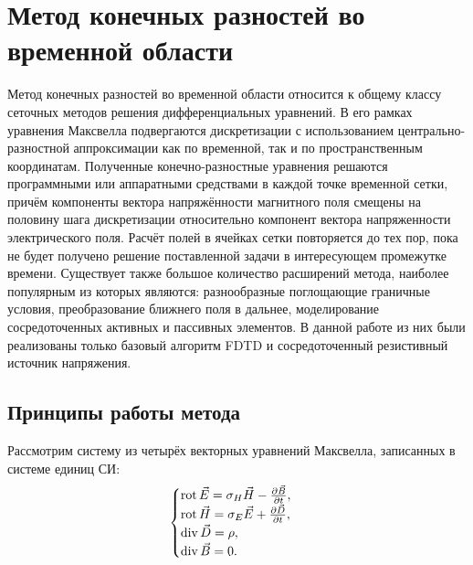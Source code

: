 \section{Метод конечных разностей во временной области}

Метод конечных разностей во временной области относится к общему классу сеточных методов решения дифференциальных уравнений. В его рамках уравнения Максвелла подвергаются дискретизации с использованием центрально-разностной аппроксимации как по временной, так и по пространственным координатам. Полученные конечно-разностные уравнения решаются программными или аппаратными средствами в каждой точке временной сетки, причём компоненты вектора напряжённости магнитного поля смещены на половину шага дискретизации относительно компонент вектора напряженности электрического поля. Расчёт полей в ячейках сетки повторяется до тех пор, пока не будет получено решение поставленной задачи в интересующем промежутке времени.
Существует также большое количество расширений метода, наиболее популярным из которых являются: разнообразные поглощающие граничные условия, преобразование ближнего поля в дальнее, моделирование сосредоточенных активных и пассивных элементов. В данной работе из них были реализованы только базовый алгоритм FDTD и сосредоточенный резистивный источник напряжения.

\subsection{Принципы работы метода}

Рассмотрим систему из четырёх векторных уравнений Максвелла, записанных в системе единиц СИ:
\begin{equation*}
	\begin{cases}
		\operatorname{rot}\vec{E} = \sigma_{H}\vec{H}-\frac{\partial {\vec{B}}}{\partial {t}}, \\
		\operatorname{rot}\vec{H} = \sigma_{E}\vec{E}+\frac{\partial {\vec{D}}}{\partial {t}}, \\
		\operatorname{div}\vec{D} = \rho, \\
		\operatorname{div}\vec{B} = 0.
	\end{cases}
\end{equation*}


